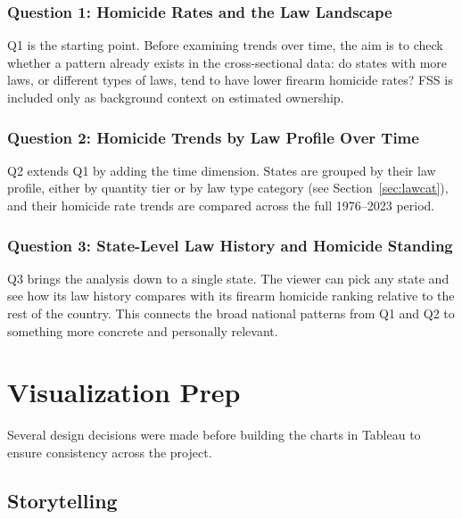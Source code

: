 \documentclass[a4paper,11pt]{article}
\begin{document}
\subsubsection{Question 1: Homicide Rates and the Law Landscape}\label{q1}

\par
Q1 is the starting point. Before examining trends over time, the aim is to
check whether a pattern already exists in the cross-sectional data: do states
with more laws, or different types of laws, tend to have lower firearm homicide
rates? FSS is included only as background context on estimated ownership.

\subsubsection{Question 2: Homicide Trends by Law Profile Over Time}\label{q2}

\par
Q2 extends Q1 by adding the time dimension. States are grouped by their law
profile, either by quantity tier or by law type category
(see Section~\ref{sec:lawcat}), and their homicide rate trends are compared
across the full 1976--2023 period.

\subsubsection{Question 3: State-Level Law History and Homicide Standing}\label{q3}

\par
Q3 brings the analysis down to a single state. The viewer can pick any state
and see how its law history compares with its firearm homicide ranking relative
to the rest of the country. This connects the broad national patterns from Q1
and Q2 to something more concrete and personally relevant.

\section{Visualization Prep}

\par
Several design decisions were made before building the charts in Tableau to
ensure consistency across the project.

\subsection{Storytelling}
\end{document}
